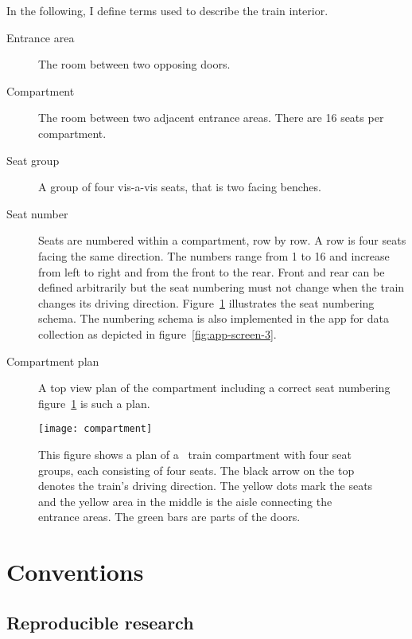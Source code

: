 In the following, I define terms used to describe the train interior.

\begin{description}

  \item[Entrance area] The room between two opposing doors.

  \item[Compartment] The room between two adjacent entrance areas.
    There are 16 seats per compartment.

  \item[Seat group] A group of four vis-a-vis seats, that is two facing benches.

  \item[Seat number] Seats are numbered within a compartment, row by row.
    A row is four seats facing the same direction.
    The numbers range from 1 to 16 and increase from left to right and
    from the front to the rear.
    Front and rear can be defined arbitrarily but the seat numbering must not
    change when the train changes its driving direction.
    Figure~\ref{fig:compartment} illustrates the seat numbering schema.
    The numbering schema is also implemented in the app for data collection as
    depicted in figure~\ref{fig:app-screen-3}.

  \item[Compartment plan] A top view plan of the compartment including a
    correct seat numbering \eg figure~\ref{fig:compartment} is such a plan.

\end{description}

\begin{figure}[htb]
  \centering
  \texttt{[image: compartment]}
  \caption[Plan of a \sbahn\ train compartment.]{%
    This figure shows a plan of a \sbahn\ train compartment with four seat
    groups, each consisting of four seats.
    The black arrow on the top denotes the train's driving direction.
    The yellow dots mark the seats and the yellow area in the middle is the
    aisle connecting the entrance areas.
    The green bars are parts of the doors.
  }\label{fig:compartment}
\end{figure}

\section{Conventions}

\subsection{Reproducible research}

